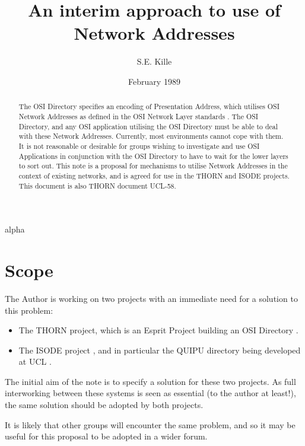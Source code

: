\author {S.E. Kille}
\date {February 1989}
\title {An interim approach to use of Network Addresses}

 {alpha}
\maketitle
\begin {abstract} The OSI Directory specifies an encoding of
Presentation Address, which utilises OSI Network Addresses as
defined in the OSI Network Layer standards \cite{CCITT.Directory}
\cite{ISO.Network.Naming}.
The OSI Directory, and any OSI application
utilising the OSI Directory must be able to deal with these Network
Addresses.  Currently, most environments cannot cope with them.  It
is not reasonable or desirable for groups wishing to investigate and
use OSI Applications in conjunction with the OSI Directory to have
to wait for the lower layers to sort out.  This note is a proposal
for mechanisms to utilise Network Addresses in the context of
existing networks, and is agreed for use in the THORN and ISODE projects.
This document is also THORN document UCL-58.

\end {abstract}

\section {Scope}

The Author is working on two projects with an immediate need for a
solution to this problem:

\begin {itemize}
\item The THORN project, which is an Esprit Project building an OSI
Directory \cite{THORN.ECW88}.

\item The ISODE project \cite{ISODE.Manual}, and in particular the
QUIPU directory being developed at UCL \cite{QUIPU.IFIP}.
\end {itemize}

The initial aim of the note is to specify a solution for these two
projects.  As full interworking between these systems is seen as
essential (to the author at least!), the same solution should be
adopted by both projects.

It is likely that other groups will encounter the same problem, and
so it may be useful for this proposal to be adopted in a wider
forum.

